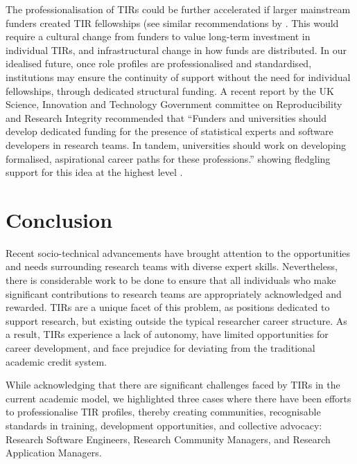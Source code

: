 \documentclass[authordate,meta]{jote-new-article}
\begin{document}
The professionalisation of TIRs could be further accelerated if larger mainstream funders created TIR fellowships (see similar recommendations by . This would require a cultural change from funders to value long-term investment in individual TIRs, and infrastructural change in how funds are distributed. In our idealised future, once role profiles are professionalised and standardised, institutions may ensure the continuity of support without the need for individual fellowships, through dedicated structural funding. A recent report by the UK Science, Innovation and Technology Government committee \parencites{Science2023} on Reproducibility and Research Integrity recommended that “Funders and universities should develop dedicated funding for the presence of statistical experts and software developers in research teams. In tandem, universities should work on developing formalised, aspirational career paths for these professions.” showing fledgling support for this idea at the highest level \parencites{Science2023}.



\section{Conclusion}



Recent socio-technical advancements have brought attention to the opportunities and needs surrounding research teams with diverse expert skills. Nevertheless, there is considerable work to be done to ensure that all individuals who make significant contributions to research teams are appropriately acknowledged and rewarded. TIRs are a unique facet of this problem, as positions dedicated to support research, but existing outside the typical researcher career structure. As a result, TIRs experience a lack of autonomy, have limited opportunities for career development, and face prejudice for deviating from the traditional academic credit system.







While acknowledging that there are significant challenges faced by TIRs in the current academic model, we highlighted three cases where there have been efforts to professionalise TIR profiles, thereby creating communities, recognisable standards in training, development opportunities, and collective advocacy: Research Software Engineers, Research Community Managers, and Research Application Managers.
\end{document}
